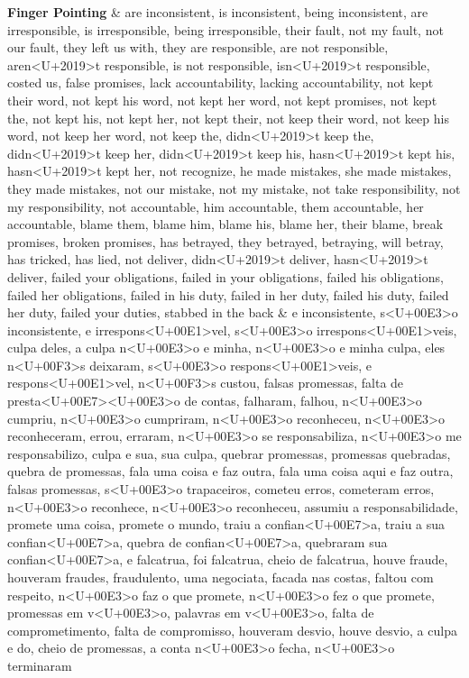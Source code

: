 \documentclass[smallextended]{svjour3}       %
\begin{document}
\begin{landscape}
\begin{longtabu}
\textbf{Finger Pointing} & are inconsistent, is inconsistent, being inconsistent, are irresponsible, is irresponsible, being irresponsible, their fault, not my fault, not our fault, they left us with, they are responsible, are not responsible, aren<U+2019>t responsible, is not responsible, isn<U+2019>t responsible, costed us, false promises, lack accountability, lacking accountability, not kept their word, not kept his word, not kept her word, not kept promises, not kept the, not kept his, not kept her, not kept their, not keep their word, not keep his word, not keep her word, not keep the, didn<U+2019>t keep the, didn<U+2019>t keep her, didn<U+2019>t keep his, hasn<U+2019>t kept his, hasn<U+2019>t kept her, not recognize, he made mistakes, she made mistakes, they made mistakes, not our mistake, not my mistake, not take responsibility, not my responsibility, not accountable, him accountable, them accountable, her accountable, blame them, blame him, blame his, blame her, their blame, break promises, broken promises, has betrayed, they betrayed, betraying, will betray, has tricked, has lied, not deliver, didn<U+2019>t deliver, hasn<U+2019>t deliver, failed your obligations, failed in your obligations, failed his obligations, failed her obligations, failed in his duty, failed in her duty, failed his duty, failed her duty, failed your duties, stabbed in the back & e inconsistente, s<U+00E3>o inconsistente, e irrespons<U+00E1>vel, s<U+00E3>o irrespons<U+00E1>veis, culpa deles, a culpa n<U+00E3>o e minha, n<U+00E3>o e minha culpa, eles n<U+00F3>s deixaram, s<U+00E3>o respons<U+00E1>veis, e respons<U+00E1>vel, n<U+00F3>s custou, falsas promessas, falta de presta<U+00E7><U+00E3>o de contas, falharam, falhou, n<U+00E3>o cumpriu, n<U+00E3>o cumpriram, n<U+00E3>o reconheceu, n<U+00E3>o reconheceram, errou, erraram, n<U+00E3>o se responsabiliza, n<U+00E3>o me responsabilizo, culpa e sua, sua culpa, quebrar promessas, promessas quebradas, quebra de promessas, fala uma coisa e faz outra, fala uma coisa aqui e faz outra, falsas promessas, s<U+00E3>o trapaceiros, cometeu erros, cometeram erros, n<U+00E3>o reconhece, n<U+00E3>o reconheceu, assumiu a responsabilidade, promete uma coisa, promete o mundo, traiu a confian<U+00E7>a, traiu a sua confian<U+00E7>a, quebra de confian<U+00E7>a, quebraram sua confian<U+00E7>a, e falcatrua, foi falcatrua, cheio de falcatrua, houve fraude, houveram fraudes, fraudulento, uma negociata, facada nas costas, faltou com respeito, n<U+00E3>o faz o que promete, n<U+00E3>o fez o que promete, promessas em v<U+00E3>o, palavras em v<U+00E3>o, falta de comprometimento, falta de compromisso, houveram desvio, houve desvio, a culpa e do, cheio de promessas, a conta n<U+00E3>o fecha, n<U+00E3>o terminaram\\

\end{longtabu}
\end{landscape}
\end{document}
